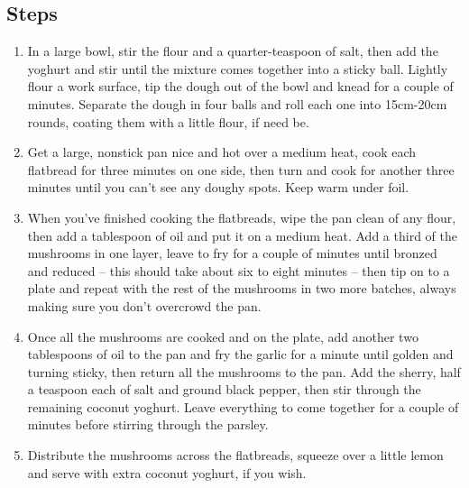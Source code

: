 \documentclass{book}
\begin{document}
\subsection*{Steps}
\begin{enumerate}
\item In a large bowl, stir the flour and a quarter-teaspoon of salt, then add the yoghurt and stir until the mixture comes together into a sticky ball. Lightly flour a work surface, tip the dough out of the bowl and knead for a couple of minutes. Separate the dough in four balls and roll each one into 15cm-20cm rounds, coating them with a little flour, if need be.
\item Get a large, nonstick pan nice and hot over a medium heat, cook each flatbread for three minutes on one side, then turn and cook for another three minutes until you can’t see any doughy spots. Keep warm under foil.
\item When you’ve finished cooking the flatbreads, wipe the pan clean of any flour, then add a tablespoon of oil and put it on a medium heat. Add a third of the mushrooms in one layer, leave to fry for a couple of minutes until bronzed and reduced – this should take about six to eight minutes – then tip on to a plate and repeat with the rest of the mushrooms in two more batches, always making sure you don’t overcrowd the pan.
\item Once all the mushrooms are cooked and on the plate, add another two tablespoons of oil to the pan and fry the garlic for a minute until golden and turning sticky, then return all the mushrooms to the pan. Add the sherry, half a teaspoon each of salt and ground black pepper, then stir through the remaining coconut yoghurt. Leave everything to come together for a couple of minutes before stirring through the parsley.
\item Distribute the mushrooms across the flatbreads, squeeze over a little lemon and serve with extra coconut yoghurt, if you wish.
\end{enumerate}
\newpage
\end{document}
